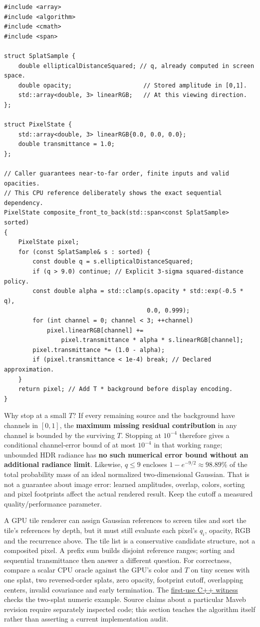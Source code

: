 \begin{verbatim}
#include <array>
#include <algorithm>
#include <cmath>
#include <span>

struct SplatSample {
    double ellipticalDistanceSquared; // q, already computed in screen space.
    double opacity;                    // Stored amplitude in [0,1].
    std::array<double, 3> linearRGB;   // At this viewing direction.
};

struct PixelState {
    std::array<double, 3> linearRGB{0.0, 0.0, 0.0};
    double transmittance = 1.0;
};

// Caller guarantees near-to-far order, finite inputs and valid opacities.
// This CPU reference deliberately shows the exact sequential dependency.
PixelState composite_front_to_back(std::span<const SplatSample> sorted)
{
    PixelState pixel;
    for (const SplatSample& s : sorted) {
        const double q = s.ellipticalDistanceSquared;
        if (q > 9.0) continue; // Explicit 3-sigma squared-distance policy.
        const double alpha = std::clamp(s.opacity * std::exp(-0.5 * q),
                                        0.0, 0.999);
        for (int channel = 0; channel < 3; ++channel)
            pixel.linearRGB[channel] +=
                pixel.transmittance * alpha * s.linearRGB[channel];
        pixel.transmittance *= (1.0 - alpha);
        if (pixel.transmittance < 1e-4) break; // Declared approximation.
    }
    return pixel; // Add T * background before display encoding.
}
\end{verbatim}

Why stop at a small \(T\)? If every remaining source and the background have channels in \([0,1]\), the \textbf{maximum missing residual contribution} in any channel is bounded by the surviving \(T\). Stopping at \(10^{-4}\) therefore gives a conditional channel-error bound of at most \(10^{-4}\) in that working range; unbounded HDR radiance has \textbf{no such numerical error bound without an additional radiance limit}. Likewise, \(q\leq9\) encloses \(1-e^{-9/2}\approx98.89\%\) of the total probability mass of an ideal normalized two-dimensional Gaussian. That is not a guarantee about image error: learned amplitudes, overlap, colors, sorting and pixel footprints affect the actual rendered result. Keep the cutoff a measured quality/performance parameter.

A GPU tile renderer can assign Gaussian references to screen tiles and sort the tile's references by depth, but it must still evaluate each pixel's \(q_i\), opacity, RGB and the recurrence above. The tile list is a conservative candidate structure, not a composited pixel. A prefix sum builds disjoint reference ranges; sorting and sequential transmittance then answer a different question. For correctness, compare a scalar CPU oracle against the GPU's color and \(T\) on tiny scenes with one splat, two reversed-order splats, zero opacity, footprint cutoff, overlapping centers, invalid covariance and early termination. The \hyperref[source-file-a41016f2e326b40cdff18ff4]{first-use C++ witness} checks the two-splat numeric example. Source claims about a particular Maveb revision require separately inspected code; this section teaches the algorithm itself rather than asserting a current implementation audit.

